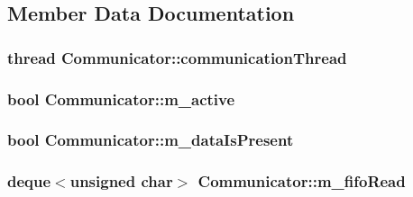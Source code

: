 \subsection{Member Data Documentation}
\hypertarget{classCommunicator_a5418b61d132b1e5ff573d7eb7a7e2e0c}{
\subsubsection[{communication\-Thread}]{\setlength{\rightskip}{0pt plus 5cm}thread Communicator\-::communication\-Thread\hspace{0.3cm}{\ttfamily [private]}}}\label{classCommunicator_a5418b61d132b1e5ff573d7eb7a7e2e0c}
\hypertarget{classCommunicator_a42a770b0ce7f2b683e4bc1d0f887f14c}{
\subsubsection[{m\-\_\-active}]{\setlength{\rightskip}{0pt plus 5cm}bool Communicator\-::m\-\_\-active\hspace{0.3cm}{\ttfamily [private]}}}\label{classCommunicator_a42a770b0ce7f2b683e4bc1d0f887f14c}
\hypertarget{classCommunicator_acbac815df12652c546240cc172ddaf33}{
\subsubsection[{m\-\_\-data\-Is\-Present}]{\setlength{\rightskip}{0pt plus 5cm}bool Communicator\-::m\-\_\-data\-Is\-Present\hspace{0.3cm}{\ttfamily [private]}}}\label{classCommunicator_acbac815df12652c546240cc172ddaf33}
\hypertarget{classCommunicator_af3f7e36ef85b0ca55d9720b24c94a3d5}{
\subsubsection[{m\-\_\-fifo\-Read}]{\setlength{\rightskip}{0pt plus 5cm}deque$<$unsigned char$>$ Communicator\-::m\-\_\-fifo\-Read\hspace{0.3cm}{\ttfamily [private]}}}\label{classCommunicator_af3f7e36ef85b0ca55d9720b24c94a3d5}
